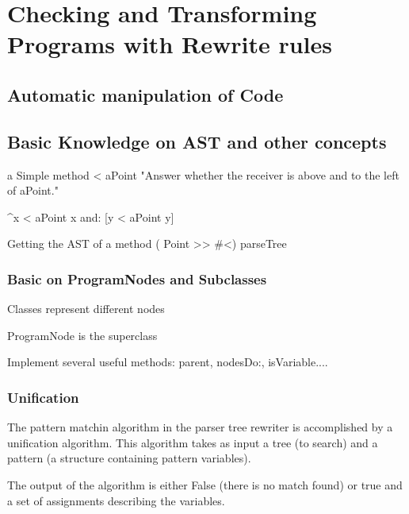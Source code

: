 \documentclass[a4paper,10pt,twoside]{book}
\begin{document}
\fi
\sloppy
\chapter{Checking and Transforming Programs with Rewrite rules}




\section{Automatic manipulation of Code}




\section{Basic Knowledge on AST and other concepts}


\begin{code}{a Simple method}
< aPoint 
	"Answer whether the receiver is above and to the left of aPoint."

	^x < aPoint x and: [y < aPoint y]
\end{code}
	
	
\begin{code}{Getting the AST of a method}
( Point >> #<) parseTree
\end{code}	


\subsection{Basic on ProgramNodes and Subclasses}
Classes represent different nodes

ProgramNode is the superclass

Implement several useful methods: parent, nodesDo:, isVariable....



\subsection{Unification}
The pattern matchin algorithm in the parser tree rewriter is accomplished by a unification algorithm. This algorithm takes as input a tree (to search) and a pattern (a structure containing pattern variables).

The output of the algorithm is either False (there is no match found) or true and a set of assignments describing the variables. 
\end{document}
